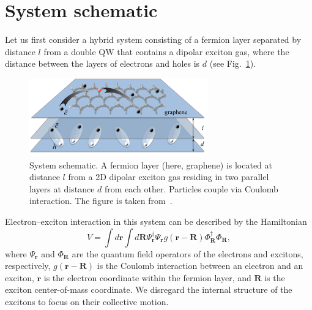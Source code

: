 %
%
\section{System schematic}
Let us first consider a hybrid system consisting of a fermion layer separated by distance $l$ from a double QW that contains a dipolar exciton gas, where the distance between the layers of electrons and holes is $d$ (see Fig.~\ref{fig:Ch6_1}).
%
%
%
\begin{figure}[ht]
\centering
\includegraphics[width=0.69\textwidth]{Fig/Ch6/Fig1.pdf}
\caption[Hybrid system schematic]{System schematic. A fermion layer (here, graphene) is located at distance $l$ from a 2D dipolar exciton gas residing in two parallel layers at distance $d$ from each other. Particles couple via Coulomb interaction. The figure is taken from~\cite{Sun:2019aa}.}
\label{fig:Ch6_1}
\end{figure}
%
%
%
Electron--exciton interaction in this system can be described by the Hamiltonian
%
\begin{equation}\label{CH6_eq.1}
V=\int d\mathbf{r}\int d\mathbf{R}\Psi^\dag_\mathbf{r}\Psi_\mathbf{r}g\left(\mathbf{r}-\mathbf{R}\right)\Phi^\dag_\mathbf{R}\Phi_\mathbf{R},
\end{equation}
%
where $\Psi_\mathbf{r}$ and $\Phi_\mathbf{R}$ are the quantum field operators of the electrons and excitons, respectively, $g\left(\mathbf{r}-\mathbf{R}\right)$ is the Coulomb interaction between an electron and an exciton, $\mathbf{r}$ is the electron coordinate within the fermion layer, and $\mathbf{R}$ is the exciton center-of-mass coordinate.
We disregard the internal structure of the excitons to focus on their collective motion.


